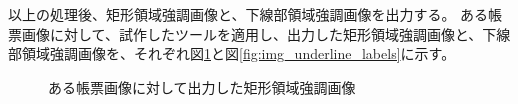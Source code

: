 以上の処理後、矩形領域強調画像と、下線部領域強調画像を出力する。
ある帳票画像に対して、試作したツールを適用し、出力した矩形領域強調画像と、下線部領域強調画像を、それぞれ図\ref{fig:img_rect_labels}と図\ref{fig:img_underline_labels}に示す。
\begin{figure}[tp]
    \begin{center}
        \caption{ある帳票画像に対して出力した矩形領域強調画像}
        \label{fig:img_rect_labels}
    \end{center}
\end{figure}
